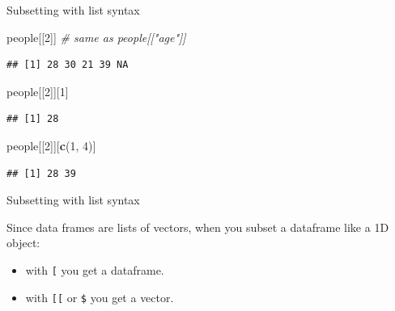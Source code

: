 \documentclass[ignorenonframetext,]{beamer}
\newenvironment{Shaded}{\begin{snugshade}}{\end{snugshade}}
\newcommand{\CommentTok}[1]{\textcolor[rgb]{0.56,0.35,0.01}{\textit{#1}}}
\newcommand{\DecValTok}[1]{\textcolor[rgb]{0.00,0.00,0.81}{#1}}
\newcommand{\KeywordTok}[1]{\textcolor[rgb]{0.13,0.29,0.53}{\textbf{#1}}}
\newcommand{\NormalTok}[1]{#1}
\providecommand{\tightlist}{%
  \setlength{\itemsep}{0pt}\setlength{\parskip}{0pt}}
\begin{document}
\begin{frame}[fragile]{Subsetting with list syntax}
\protect\hypertarget{subsetting-with-list-syntax-4}{}

\begin{Shaded}
\begin{Highlighting}[]
\NormalTok{people[[}\DecValTok{2}\NormalTok{]] }\CommentTok{# same as people[["age"]]}
\end{Highlighting}
\end{Shaded}

\begin{verbatim}
## [1] 28 30 21 39 NA
\end{verbatim}

\begin{Shaded}
\begin{Highlighting}[]
\NormalTok{people[[}\DecValTok{2}\NormalTok{]][}\DecValTok{1}\NormalTok{]}
\end{Highlighting}
\end{Shaded}

\begin{verbatim}
## [1] 28
\end{verbatim}

\begin{Shaded}
\begin{Highlighting}[]
\NormalTok{people[[}\DecValTok{2}\NormalTok{]][}\KeywordTok{c}\NormalTok{(}\DecValTok{1}\NormalTok{, }\DecValTok{4}\NormalTok{)]}
\end{Highlighting}
\end{Shaded}

\begin{verbatim}
## [1] 28 39
\end{verbatim}

\end{frame}

\begin{frame}[fragile]{Subsetting with list syntax}
\protect\hypertarget{subsetting-with-list-syntax-5}{}

Since data frames are lists of vectors, when you subset a dataframe like
a 1D object:

\begin{itemize}
\tightlist
\item
  with \texttt{{[}} you get a dataframe.
\item
  with \texttt{{[}{[}} or \texttt{\$} you get a vector.
\end{itemize}

\end{frame}
\end{document}
